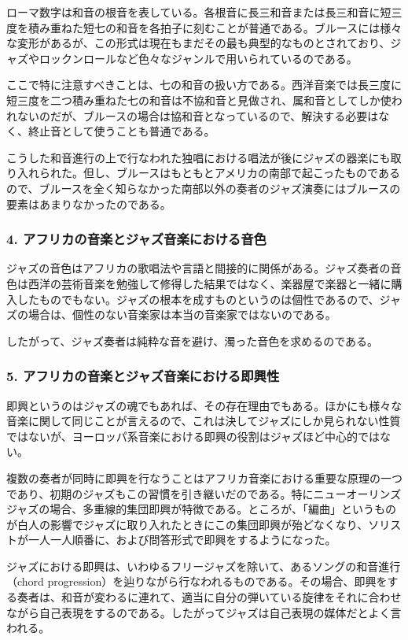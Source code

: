 ローマ数字は和音の根音を表している。各根音に長三和音または長三和音に短三度を積み重ねた短七の和音を各拍子に刻むことが普通である。ブルースには様々な変形があるが、この形式は現在もまだその最も典型的なものとされており、ジャズやロックンロールなど色々なジャンルで用いられているのである。

ここで特に注意すべきことは、七の和音の扱い方である。西洋音楽では長三度に短三度を二つ積み重ねた七の和音は不協和音と見做され、属和音としてしか使われないのだが、ブルースの場合は協和音となっているので、解決する必要はなく、終止音として使うことも普通である。

こうした和音進行の上で行なわれた独唱における唱法が後にジャズの器楽にも取り入れられた。但し、ブルースはもともとアメリカの南部で起こったものであるので、ブルースを全く知らなかった南部以外の奏者のジャズ演奏にはブルースの要素はあまりなかったのである。

\subsubsection{4. アフリカの音楽とジャズ音楽における音色}

ジャズの音色はアフリカの歌唱法や言語と間接的に関係がある。ジャズ奏者の音色は西洋の芸術音楽を勉強して修得した結果ではなく、楽器屋で楽器と一緒に購入したものでもない。ジャズの根本を成すものというのは個性であるので、ジャズの場合は、個性のない音楽家は本当の音楽家ではないのである。

したがって、ジャズ奏者は純粋な音を避け、濁った音色を求めるのである。

\subsubsection{5. アフリカの音楽とジャズ音楽における即興性}

即興というのはジャズの魂でもあれば、その存在理由でもある。ほかにも様々な音楽に関して同じことが言えるので、これは決してジャズにしか見られない性質ではないが、ヨーロッパ系音楽における即興の役割はジャズほど中心的ではない。

複数の奏者が同時に即興を行なうことはアフリカ音楽における重要な原理の一つであり、初期のジャズもこの習慣を引き継いだのである。特にニューオーリンズジャズの場合、多重線的集団即興が特徴である。ところが、「編曲」というものが白人の影響でジャズに取り入れたときにこの集団即興が殆どなくなり、ソリストが一人一人順番に、および問答形式で即興をするようになった。

ジャズにおける即興は、いわゆるフリージャズを除いて、あるソングの和音進行（chord progression）を辿りながら行なわれるものである。その場合、即興をする奏者は、和音が変わるに連れて、適当に自分の弾いている旋律をそれに合わせながら自己表現をするのである。したがってジャズは自己表現の媒体だとよく言われる。

